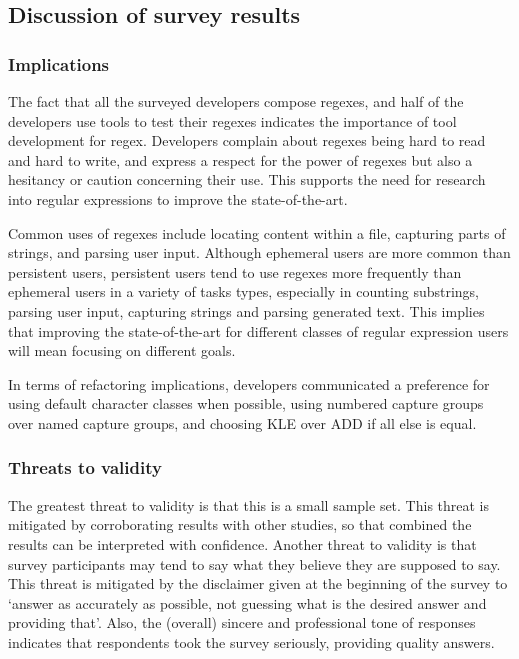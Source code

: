 \subsection{Discussion of survey results}

\subsubsection{Implications}
The fact that all the surveyed developers compose regexes, and half of the developers use tools to test their regexes indicates the importance of tool development for regex.  Developers complain about regexes being hard to read and hard to write, and express a respect for the power of regexes but also a hesitancy or caution concerning their use.  This supports the need for research into regular expressions to improve the state-of-the-art.

Common uses of regexes include locating content within a file, capturing parts of strings, and parsing user input.  Although ephemeral users are more common than persistent users, persistent users tend to use regexes more frequently than ephemeral users in a variety of tasks types, especially in counting substrings, parsing user input, capturing strings and parsing generated text.  This implies that improving the state-of-the-art for different classes of regular expression users will mean focusing on different goals.

In terms of refactoring implications, developers communicated a preference for using default character classes when possible, using numbered capture groups over named capture groups, and choosing KLE over ADD if all else is equal.

\subsubsection{Threats to validity}
The greatest threat to validity is that this is a small sample set.  This threat is mitigated by corroborating results with other studies, so that combined the results can be interpreted with confidence.
Another threat to validity is that survey participants may tend to say what they believe they are supposed to say.  This threat is mitigated by the disclaimer given at the beginning of the survey to `answer as accurately as possible, not guessing what is the desired answer and providing that'.  Also, the (overall) sincere and professional tone of responses indicates that respondents took the survey seriously, providing quality answers.


